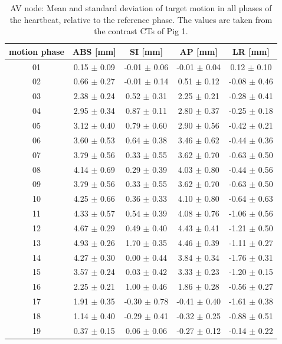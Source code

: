 \documentclass[type=dr, dr=rernat, accentcolor=tud7b,colorbacktitle, bigchapter, openright, twoside, 12pt ]{tudthesis}
\begin{document}
\newpage

\begin{table}[H]
  \centering
  \scriptsize
  \caption{AV node: Mean and standard deviation of target motion in all phases of the heartbeat, relative to the reference phase. The values are 
  taken from the contrast CTs of Pig 1.}
  \begin{tabular}{|c|c|c|c|c|}
    \hline\hline
    motion phase\rule{0pt}{2.6ex}\rule[-1.2ex]{0pt}{0pt} & ABS [mm] & SI [mm] & AP [mm] & LR [mm]\\
    \hline
01 &0.15 $\pm$ 0.09 &-0.01 $\pm$ 0.06 &-0.01 $\pm$ 0.04 &0.12 $\pm$ 0.10 \\
02 &0.66 $\pm$ 0.27 &-0.01 $\pm$ 0.14 &0.51 $\pm$ 0.12 &-0.08 $\pm$ 0.46 \\
03 &2.38 $\pm$ 0.24 &0.52 $\pm$ 0.31 &2.25 $\pm$ 0.21 &-0.28 $\pm$ 0.41 \\
04 &2.95 $\pm$ 0.34 &0.87 $\pm$ 0.11 &2.80 $\pm$ 0.37 &-0.25 $\pm$ 0.18 \\
05 &3.12 $\pm$ 0.40 &0.79 $\pm$ 0.60 &2.90 $\pm$ 0.56 &-0.42 $\pm$ 0.21 \\
06 &3.60 $\pm$ 0.53 &0.64 $\pm$ 0.38 &3.46 $\pm$ 0.62 &-0.44 $\pm$ 0.36 \\
07 &3.79 $\pm$ 0.56 &0.33 $\pm$ 0.55 &3.62 $\pm$ 0.70 &-0.63 $\pm$ 0.50 \\
08 &4.14 $\pm$ 0.69 &0.29 $\pm$ 0.39 &4.03 $\pm$ 0.80 &-0.44 $\pm$ 0.56 \\
09 &3.79 $\pm$ 0.56 &0.33 $\pm$ 0.55 &3.62 $\pm$ 0.70 &-0.63 $\pm$ 0.50 \\
10 &4.25 $\pm$ 0.66 &0.36 $\pm$ 0.33 &4.10 $\pm$ 0.80 &-0.64 $\pm$ 0.63 \\
11 &4.33 $\pm$ 0.57 &0.54 $\pm$ 0.39 &4.08 $\pm$ 0.76 &-1.06 $\pm$ 0.56 \\
12 &4.67 $\pm$ 0.29 &0.49 $\pm$ 0.40 &4.43 $\pm$ 0.41 &-1.21 $\pm$ 0.50 \\
13 &4.93 $\pm$ 0.26 &1.70 $\pm$ 0.35 &4.46 $\pm$ 0.39 &-1.11 $\pm$ 0.27 \\
14 &4.27 $\pm$ 0.30 &0.00 $\pm$ 0.44 &3.84 $\pm$ 0.34 &-1.76 $\pm$ 0.31 \\
15 &3.57 $\pm$ 0.24 &0.03 $\pm$ 0.42 &3.33 $\pm$ 0.23 &-1.20 $\pm$ 0.15 \\
16 &2.25 $\pm$ 0.21 &1.00 $\pm$ 0.46 &1.86 $\pm$ 0.28 &-0.56 $\pm$ 0.27 \\
17 &1.91 $\pm$ 0.35 &-0.30 $\pm$ 0.78 &-0.41 $\pm$ 0.40 &-1.61 $\pm$ 0.38 \\
18 &1.14 $\pm$ 0.40 &-0.29 $\pm$ 0.41 &-0.32 $\pm$ 0.25 &-0.88 $\pm$ 0.51 \\
19 &0.37 $\pm$ 0.15 &0.06 $\pm$ 0.06 &-0.27 $\pm$ 0.12 &-0.14 $\pm$ 0.22 \\
    \hline\hline
  \end{tabular}
  \label{tab:motion:AV:Pig1}
\end{table}
\end{document}
